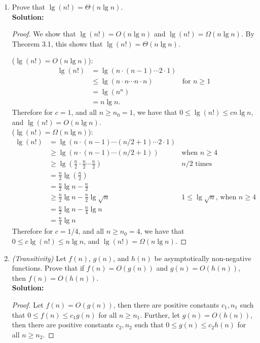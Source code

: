 \documentclass[letterpaper,11pt]{article}
\begin{document}
\begin{enumerate}
\newpage
\item Prove that $\lg(n!) = \Theta(n \lg n)$.\\
\textbf{Solution:}
\begin{proof}
We show that $\lg(n!) = O(n\lg n)$ and $\lg(n!)= \Omega(n\lg n)$. By Theorem 3.1, this shows that $\lg(n!)=\Theta(n\lg n)$.

($\lg(n!) = O(n\lg n)$):
\begin{align*}
\lg(n!) &= \lg(n\cdot (n-1)\cdots 2\cdot 1)&\\
        &\leq\lg(n\cdot n \cdots n\cdot n) & \text{for $n \geq 1$}\\
        &=\lg(n^n) &\\
        &=n\lg n. &
\end{align*}
Therefore for $c=1$, and all $n\geq n_0=1$, we have that $0\leq \lg(n!) \leq cn\lg n$, and $\lg(n!) = O(n\lg n)$.\\

($\lg(n!) = \Omega(n\lg n)$):
\begin{align*}
\lg(n!) &= \lg(n\cdot (n-1)\cdots (n/2+1)\cdots2\cdot 1)&\\
        &\geq \lg(n\cdot (n-1)\cdots (n/2+1))& \text{when $n\geq 4$}\\
        &\geq \lg(\frac{n}{2}\cdot \frac{n}{2} \cdots \frac{n}{2}) & \text{$n/2$ times}\\
        &=\frac{n}{2}\lg(\frac{n}{2}) &\\
        &=\frac{n}{2}\lg{n} - \frac{n}{2} &\\
        &\geq\frac{n}{2}\lg{n} - \frac{n}{2}\lg{\sqrt{n}} &\text{$1 \leq \lg{\sqrt{n}}$, when $n\geq 4$}&\\
        &=\frac{n}{2}\lg{n} - \frac{n}{4}\lg{n} &\\
        &=\frac{n}{4}\lg{n}&
\end{align*}
Therefore for $c=1/4$, and all $n\geq n_0=4$, we have that $0\leq c\lg(n!) \leq n\lg n$, and $\lg(n!) = \Omega(n\lg n)$.
\end{proof}
\item \emph{(Transitivity)} Let $f(n)$, $g(n)$, and $h(n)$ be asymptotically non-negative functions. Prove that if $f(n) = O(g(n))$ and $g(n) = O(h(n))$, then $f(n) = O(h(n))$.\\
\textbf{Solution:}
\begin{proof}
Let $f(n) = O(g(n))$, then there are positive constants $c_1,n_1$ such that $0\leq f(n) \leq c_1g(n)$ for all $n\geq n_1$.
Further, let $g(n) = O(h(n))$, then there are positive constants $c_2,n_2$ such that $0\leq g(n) \leq c_2h(n)$ for all $n\geq n_2$.


\end{proof}
\end{enumerate}
\end{document}
